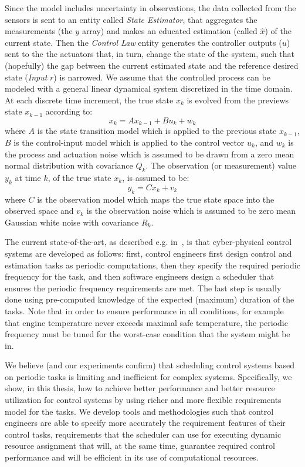 \documentclass[ twoside, 12pt ]{article}
\begin{document}
Since the model includes uncertainty in observations, the data collected from the sensors is sent to an entity called \textit{State Estimator}, that aggregates the measurements (the $y$ array) and makes an educated estimation (called $\hat{x}$) of the current state. Then the \textit{Control Law} entity generates the controller outputs ($u$) sent to the the actuators that, in turn, change the state of the system, such that (hopefully) the gap between the current estimated state and the reference desired state (\textit{Input} $r$) is narrowed.
We assume that the controlled process can be modeled with a general linear dynamical system discretized in the time domain. At each discrete time increment, the true state $x_k$ is evolved from the previews state $x_{k-1}$ according to: 
$$ x_{k}=Ax_{k-1} + Bu_{k} + w_{k} $$
where $A$ is the state transition model which is applied to the previous state $x_{k-1}$, $B$ is the control-input model which is applied to the control vector $u_k$, and $w_k$ is the process and actuation noise which is assumed to be drawn from a zero mean normal distribution with covariance $Q_k$. The observation (or measurement) value $y_k$ at time $k$, of the true state $x_k$, is assumed to be: 
$$y_k=Cx_k+v_k$$
where $C$ is the observation model which maps the true state space into the observed space and $v_k$ is the observation noise which is assumed to be zero mean Gaussian white noise with covariance $R_k$.

The current state-of-the-art, as described e.g. in~\cite{Cervin}, is that cyber-physical control systems are developed as follows: first, control engineers first design control and estimation tasks as periodic computations, then they specify the required periodic frequency for the task, and then software engineers design a scheduler that ensures the periodic frequency requirements are met. The last step is usually done using pre-computed knowledge of the expected (maximum) duration of the tasks. Note that in order to ensure performance in all conditions, for example that engine temperature never exceeds maximal safe temperature, the periodic frequency must be tuned for the worst-case condition that the system might be in.

We believe (and our experiments confirm) that scheduling control systems based on periodic tasks is limiting and inefficient for complex systems. Specifically, we show, in this thesis, how to achieve better performance and better resource utilization for control systems by using richer and more flexible requirements model for the tasks. We develop tools and methodologies such that control engineers are able to specify more accurately the requirement features of their control tasks, requirements that the scheduler can use for executing dynamic resource assignment that will, at the same time, guarantee required control performance and will be efficient in its use of computational resources.
\end{document}
